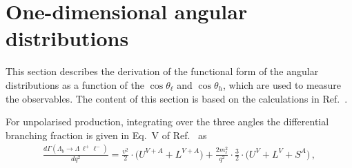 \section{One-dimensional angular distributions}

This section describes the derivation of the functional form of the angular distributions 
as a function of the $\cos\theta_\ell$ and $\cos\theta_h$, which are used to measure
the observables. The content of this section is based on the calculations in Ref.~\cite{Gutsche:2013pp}. 

For unpolarised \Lb production,
%
%
integrating over the three angles the differential branching fraction is given in Eq.~V of Ref.~\cite{Gutsche:2013pp} as
\begin{eqnarray}
\label{bjoint00}
\frac{d\Gamma(\Lambda_b \to \Lambda \,\ell^{+}\ell^{-})}{d q^2}=
\frac{v^{2}}{2}\cdot\bigg( U^{V+A} + L^{V+A} \bigg)
+\frac{2m_\ell^{2}}{q^{2}}\cdot\frac{3}{2}\cdot
\bigg( U^{V} + L^{V} + S^{A} \bigg)\,, 
\end{eqnarray}
